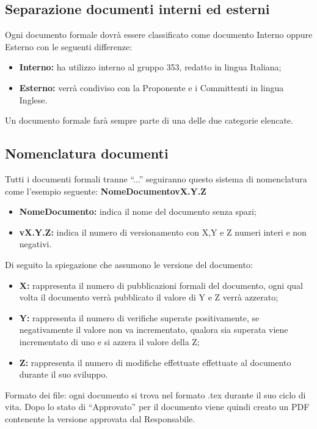 \documentclass[NormeDiProgetto.tex]{subfiles}
\begin{document}
	\subsection{Separazione documenti interni ed esterni}
	Ogni documento formale dovrà essere classificato come documento Interno
	oppure Esterno con le seguenti differenze:
	\begin{itemize}
		\item \textbf{Interno:} ha utilizzo interno al gruppo 353, redatto in lingua Italiana;
		\item \textbf{Esterno:} verrà condiviso con la Proponente e i Committenti in lingua Inglese.
	\end{itemize}
	Un documento formale farà sempre parte di una delle due categorie elencate.
	
	\subsection{Nomenclatura documenti}
	Tutti i documenti formali tranne “...” seguiranno questo sistema di nomenclatura come l'esempio seguente: \textbf{NomeDocumento\textunderscore vX.Y.Z}

	\begin{itemize}
		\item\textbf{ NomeDocumento:} indica il nome del documento senza spazi;
		\item \textbf{vX.Y.Z:} indica il numero di versionamento con X,Y e Z numeri interi e non negativi.	
	\end{itemize}
	Di seguito la spiegazione che assumono le versione del documento:
	\begin{itemize}
		\item \textbf{X:} rappresenta il numero di pubblicazioni formali del documento, ogni qual volta il documento verrà pubblicato il valore di Y e Z verrà azzerato;
		\item \textbf{Y:} rappresenta il numero di verifiche superate positivamente, se negativamente il valore non va incrementato, qualora sia superata viene incrementato di uno e si azzera il valore della Z;
		\item \textbf{Z:} rappresenta il numero di modifiche effettuate effettuate al documento durante il suo sviluppo.	
	\end{itemize}
	Formato dei file: ogni documento si trova nel formato .tex durante il suo ciclo di vita.
	Dopo lo stato di “Approvato” per il documento viene quindi creato un PDF contenente la versione approvata dal Responsabile.
	
\end{document}
